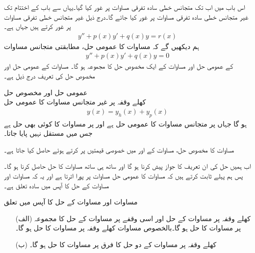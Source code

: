 اس باب میں اب تک متجانس خطی سادہ تفرقی مساوات پر غور کیا گیا۔یہاں سے باب کے اختتام تک غیر متجانس خطی سادہ تفرقی مساوات پر غور کیا جائے گا۔درج ذیل غیر متجانس خطی تفرقی مساوات پر غور کرتے ہیں جہاں  ہے۔
\begin{align}\label{مساوات_سادہ_دو_غیر_متجانس_الف}
y''+p(x)y'+q(x)y=r(x)
\end{align}
ہم دیکھیں گے کہ مساوات  کا عمومی حل، مطابقتی متجانس مساوات 
\begin{align}\label{مساوات_سادہ_دو_غیر_متجانس_ب}
y''+p(x)y'+q(x)y=0
\end{align}
کے عمومی حل اور مساوات  کے ایک مخصوص حل کا مجموعہ ہو گا۔ مساوات  کے عمومی حل اور مخصوص حل کی تعریف درج ذیل ہے۔

\quad عمومی حل اور مخصوص حل\\
کھلے وقفہ  پر غیر متجانس  مساوات  کا عمومی حل
\begin{align}\label{مساوات_سادہ_دو_غیر_متجانس_پ}
y(x)=y_h(x)+y_p(x)
\end{align}
ہو گا جہاں  پر  متجانس مساوات  کا عمومی حل ہے اور  پر  مساوات  کا کوئی بھی حل ہے جس میں مستقل نہیں پایا جاتا۔

مساوات  کا مخصوص حل، مساوات  کے   اور  میں خصوصی قیمتیں پر کرتے ہوئے حاصل کیا جاتا ہے۔

اب ہمیں حل کی ان تعریف کا جواز پیش کرنا ہو گا اور ساتھ ہی ساتھ مساوات  کا  حل  حاصل کرنا ہو گا۔پس ہم پہلے ثابت کرتے ہیں کہ مساوات  کا عمومی حل مساوات  پر پورا اترتا ہے اور یہ کہ مساوات  اور مساوات  کے حل کا آپس میں سادہ تعلق ہے۔

\quad مساوات  اور مساوات  کے حل کا آپس میں تعلق\\
\begin{enumerate}
\item[(الف)]
کھلے وقفہ  پر مساوات  کے حل  اور اسی وقفے پر مساوات  کے حل  کا مجموعہ  پر مساوات  کا حل ہو گا۔بالخصوص مساوات  کھلے وقفہ  پر مساوات  کا حل ہو گا۔
\item[(ب)]
کھلے وقفہ  پر مساوات  کے دو حل کا فرق  پر مساوات  کا حل ہو گا۔ 
\end{enumerate}

